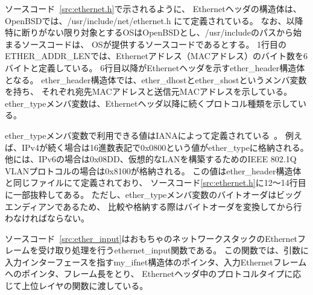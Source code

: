 ソースコード~\ref{src:ethernet.h}で示されるように、
Ethernetヘッダの構造体は、OpenBSDでは、/usr/include/net/ethernet.h にて定義されている。
なお、以降特に断りがない限り対象とするOSはOpenBSDとし、/usr/includeのパスから始まるソースコードは、
OSが提供するソースコードであるとする。
1行目のETHER\_ADDR\_LENでは、Ethernetアドレス（MACアドレス）のバイト数を6バイトと定義している。
6行目以降がEthernetヘッダを示すether\_header構造体となる。
ether\_header構造体では、ether\_dhostとether\_shostというメンバ変数を持ち、
それぞれ宛先MACアドレスと送信元MACアドレスを示している。
ether\_typeメンバ変数は、Ethernetヘッダ以降に続くプロトコル種類を示している。

ether\_typeメンバ変数で利用できる値はIANAによって定義されている~\cite{ieee802}。
例えば、IPv4が続く場合は16進数表記で0x0800という値がether\_typeに格納される。
他には、IPv6の場合は0x08DD、仮想的なLANを構築するためのIEEE 802.1Q VLANプロトコルの場合は0x8100が格納される。
この値はether\_header構造体と同じファイルにて定義されており、
ソースコード\ref{src:ethernet.h}に12〜14行目に一部抜粋してある。
ただし、ether\_typeメンバ変数のバイトオーダはビッグエンディアンであるため、
比較や格納する際はバイトオーダを変換してから行わなければならない。

ソースコード~\ref{src:ether_input}はおもちゃのネットワークスタックのEthernetフレームを受け取り処理を行うethernet\_input関数である。
この関数では、引数に入力インターフェースを指すmy\_ifnet構造体のポインタ、入力Ethernetフレームへのポインタ、フレーム長をとり、
Ethernetヘッダ中のプロトコルタイプに応じて上位レイヤの関数に渡している。

